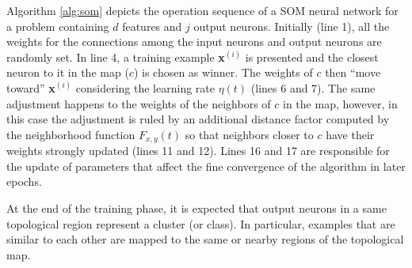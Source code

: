 Algorithm \ref{alg:som} depicts the operation sequence of a SOM neural network for a problem containing $d$ features and $j$ output neurons. Initially (line 1), all the weights for the connections among the input neurons and output neurons are randomly set. In line 4, a training example \textbf{x}$^{(i)}$ is presented and the closest neuron to it in the map ($c$) is chosen as winner. The weights of $c$ then 
``move toward'' \textbf{x}$^{(i)}$ considering the learning rate $\eta(t)$ (lines 6 and 7). The same adjustment happens to the weights of the neighbors of $c$ in the map, however, in this case the adjustment is ruled by an additional distance factor computed by the neighborhood function $F_{x,y}(t)$ so that neighbors closer to $c$ have their weights strongly updated (lines 11 and 12). Lines 16 and 17 are responsible for the update of parameters that affect the fine convergence of the algorithm in later epochs. 



At the end of the training phase, it is expected that output neurons in a same topological region represent a cluster (or class). In particular, examples that are similar to each other are mapped to the same or nearby regions of the topological map.

